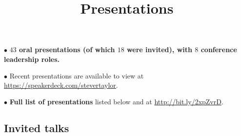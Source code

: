\documentclass[11pt,letterpaper,sans]{moderncv}
\title{Presentations}
\begin{document}
\makecvtitle 



$\bullet$ \textbf{$43$ oral presentations (of which $18$ were invited), with $8$ conference leadership roles.}  \vspace{0.2cm}

$\bullet$ Recent presentations are available to view at {\color{color1} \href{https://speakerdeck.com/stevertaylor}{https://speakerdeck.com/stevertaylor}}. \vspace{0.2cm}

$\bullet$ \textbf{Full list of presentations} listed below and at {\color{color1} \href{http://bit.ly/2xpZvrD}{http://bit.ly/2xpZvrD}}. \vspace{0.2cm}

\vspace{0.4cm}
\subsection{Invited talks} \vspace{-0.3cm}
\end{document}
